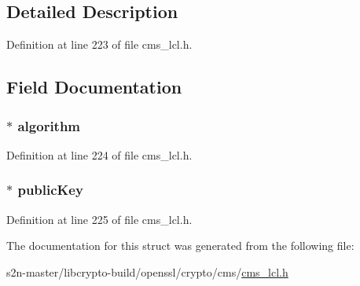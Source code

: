 \subsection{Detailed Description}


Definition at line 223 of file cms\+\_\+lcl.\+h.



\subsection{Field Documentation}
\subsubsection[{\texorpdfstring{algorithm}{algorithm}}]{$\ast$ algorithm}\hypertarget{struct_c_m_s___originator_public_key__st_a55bde876b7933b9536bdb80b6ca71fa1}{}\label{struct_c_m_s___originator_public_key__st_a55bde876b7933b9536bdb80b6ca71fa1}


Definition at line 224 of file cms\+\_\+lcl.\+h.

\subsubsection[{\texorpdfstring{public\+Key}{publicKey}}]{$\ast$ public\+Key}\hypertarget{struct_c_m_s___originator_public_key__st_abaa4257ba85b0782a4cafd428c054c13}{}\label{struct_c_m_s___originator_public_key__st_abaa4257ba85b0782a4cafd428c054c13}


Definition at line 225 of file cms\+\_\+lcl.\+h.



The documentation for this struct was generated from the following file\+:\begin{DoxyCompactItemize}
\item 
s2n-\/master/libcrypto-\/build/openssl/crypto/cms/\hyperlink{cms__lcl_8h}{cms\+\_\+lcl.\+h}\end{DoxyCompactItemize}
